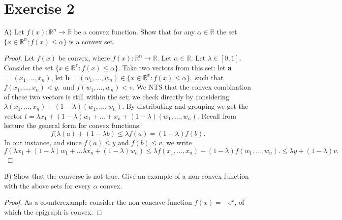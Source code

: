 \documentclass[paper=a4, fontsize=11pt]{scrartcl} %
\begin{document}

\section*{Exercise 2}
\boldmath
\textbf{}
\unboldmath
A)  Let $f(x) : \mathbb{R}^n \rightarrow \mathbb{R}$ be a convex function.  Show that for any $\alpha \in \mathbb{R}$ the set $\{ x \in \mathbb{R^n} :  f(x) \leq \alpha \}$ is a convex set.
\begin{proof}
Let $f(x)$ be convex, where $f(x): \mathbb{R^n} \rightarrow	\mathbb{R}.$  Let $\alpha \in \mathbb{R}.$  Let $\lambda \in [0, 1]$.  Consider the set $\{ x \in \mathbb{R^n}: f(x) \leq \alpha \} .$
\newline
Take two vectors from this set:  let \textbf{a}$ = (x_1, \dots , x_n)$, let \textbf{b}$ = (w_1, \dots, w_n) \in \{x \in \mathbb{R^n}: f(x) \leq \alpha \}, $ such that $f(x_1, \dots , x_n) < y,$ and $f(w_1, \dots , w_n) < v.$ 
\newline
We NTS that the convex combination of these two vectors is still within the set; we check directly by considering $\lambda(x_1, \dots , x_n) + (1 - \lambda)(w_1, \dots, w_n)$.  By distributing and grouping we get the vector $t = \lambda x_1 + (1 - \lambda)w_1 + \dots + x_n + (1 - \lambda)(w_1, \dots, w_n)$.
\newline
Recall from lecture the general form for convex functions:  $$f(\lambda (a) + (1- \lambda b) \leq \lambda f(a) = (1 - \lambda)f(b).$$  In our instance, and since $f(a) \leq y$ and $f(b) \leq v$, we write $$f(\lambda x_1 + (1 - \lambda ) w_1 + \dots \lambda x_n + (1 - \lambda)w_n) \leq \lambda f(x_1, \dots, x_n) + ( 1 - \lambda ) f (w_1, \dots, w_n). \leq \lambda y  + ( 1- \lambda ) v.$$
\end{proof}
\boldmath
\textbf{}
\unboldmath



B)  Show that the converse is not true.  Give an example of a non-convex function with the above sets for every $\alpha$ convex.
\begin{proof}
As a counterexample consider the non-concave function $f(x) = -e^x$, of which the epigraph is convex.
\end{proof}






\end{document}
